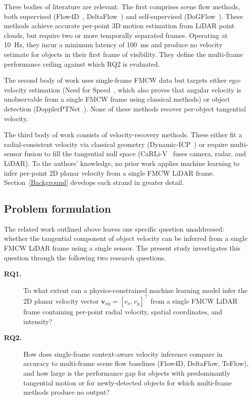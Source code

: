 \documentclass[a4paper,12pt]{article}
\begin{document}
Three bodies of literature are relevant. The first comprises scene flow methods, both supervised (Flow4D~\cite{cho2025flow4d}, DeltaFlow~\cite{zhang2025deltaflow}) and self-supervised (DoGFlow~\cite{khoche2026dogflow}). These methods achieve accurate per-point 3D motion estimation from LiDAR point clouds, but require two or more temporally separated frames. Operating at 10~Hz, they incur a minimum latency of 100~ms and produce no velocity estimate for objects in their first frame of visibility. They define the multi-frame performance ceiling against which RQ2 is evaluated.

The second body of work uses single-frame FMCW data but targets either ego-velocity estimation (Need for Speed~\cite{yoon2023needforspeed}, which also proves that angular velocity is unobservable from a single FMCW frame using classical methods) or object detection (DopplerPTNet~\cite{dopplerptnet2024}). None of these methods recover per-object tangential velocity.

The third body of work consists of velocity-recovery methods. These either fit a radial-consistent velocity via classical geometry (Dynamic-ICP~\cite{dynamicicp2025}) or require multi-sensor fusion to fill the tangential null space (CaRLi-V~\cite{zhou2025carliv} fuses camera, radar, and LiDAR). To the authors' knowledge, no prior work applies machine learning to infer per-point 2D planar velocity from a single FMCW LiDAR frame. Section~\ref{Background} develops each strand in greater detail.

\subsection{Problem formulation}

The related work outlined above leaves one specific question unaddressed: whether the tangential component of object velocity can be inferred from a single FMCW LiDAR frame using a single sensor. The present study investigates this question through the following two research questions.

\begin{description}
    \item[\textbf{RQ1.}] To what extent can a physics-constrained machine learning model infer the 2D planar velocity vector $\mathbf{v}_{xy} = [v_x, v_y]^\top$ from a single FMCW LiDAR frame containing per-point radial velocity, spatial coordinates, and intensity?

    \item[\textbf{RQ2.}] How does single-frame context-aware velocity inference compare in accuracy to multi-frame scene flow baselines (Flow4D, DeltaFlow, TeFlow), and how large is the performance gap for objects with predominantly tangential motion or for newly-detected objects for which multi-frame methods produce no output?
\end{description}
\end{document}
